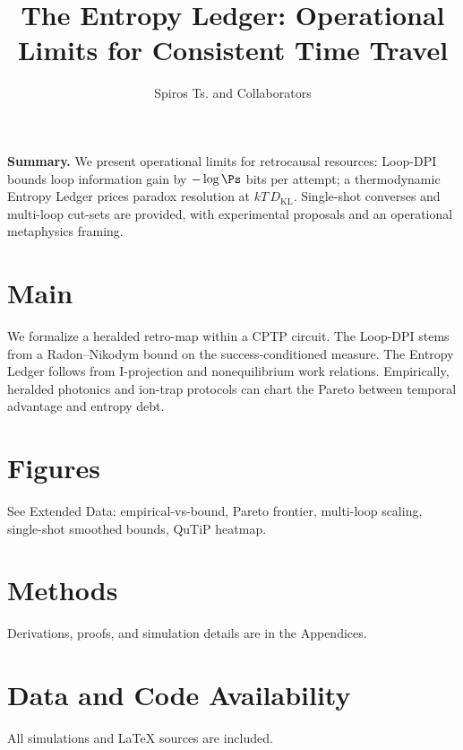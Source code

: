 \documentclass[12pt]{article}
\title{\bf The Entropy Ledger: Operational Limits for Consistent Time Travel}
\author{Spiros Ts. and Collaborators}
\date{}
\begin{document}
\maketitle

\textbf{Summary.} We present operational limits for retrocausal resources: Loop-DPI bounds loop information gain by $-\log \Ps$ bits per attempt; a thermodynamic Entropy Ledger prices paradox resolution at $kT\,D_{\mathrm{KL}}$. Single-shot converses and multi-loop cut-sets are provided, with experimental proposals and an operational metaphysics framing.

\section*{Main}
We formalize a heralded retro-map within a CPTP circuit. The Loop-DPI stems from a Radon--Nikodym bound on the success-conditioned measure. The Entropy Ledger follows from I-projection and nonequilibrium work relations. Empirically, heralded photonics and ion-trap protocols can chart the Pareto between temporal advantage and entropy debt.

\section*{Figures}
See Extended Data: empirical-vs-bound, Pareto frontier, multi-loop scaling, single-shot smoothed bounds, QuTiP heatmap.

\section*{Methods}
Derivations, proofs, and simulation details are in the Appendices.

\section*{Data and Code Availability}
All simulations and \LaTeX{} sources are included.



\end{document}
